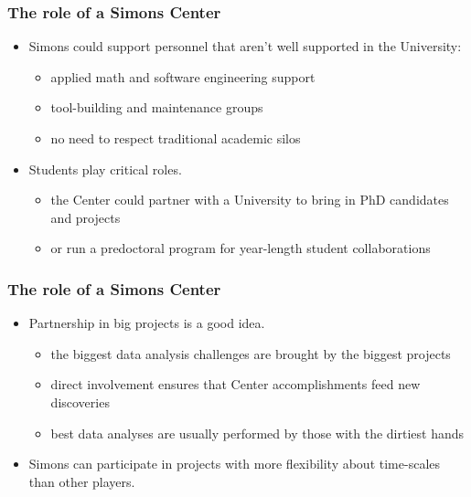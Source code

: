 \documentclass[pdftex]{beamer}
\begin{document}
\begin{frame}
  \frametitle{The role of a Simons Center}
  \begin{itemize}
  \item Simons could support personnel that aren't well supported in the University:
    \begin{itemize}
    \item applied math and software engineering support
    \item tool-building and maintenance groups
    \item no need to respect traditional academic silos
    \end{itemize}
  \item Students play critical roles.
    \begin{itemize}
    \item the Center could partner with a University to bring in
      PhD candidates and projects
    \item or run a predoctoral program for year-length student collaborations
    \end{itemize}
  \end{itemize}
\end{frame}

\begin{frame}
  \frametitle{The role of a Simons Center}
  \begin{itemize}
  \item Partnership in big projects is a good idea.
    \begin{itemize}
    \item the biggest data analysis challenges are brought by the biggest projects
    \item direct involvement ensures that Center accomplishments feed new discoveries
    \item best data analyses are usually performed by those with the dirtiest hands
    \end{itemize}
  \item Simons can participate in projects with more flexibility about
    time-scales than other players.
  \end{itemize}
\end{frame}
\end{document}
